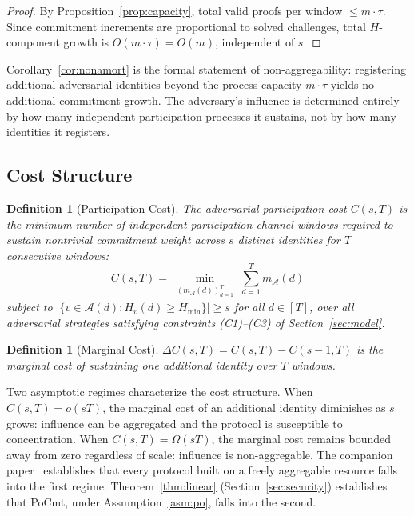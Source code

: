 \documentclass[10pt,journal,twoside]{IEEEtran}
\newtheorem{definition}[theorem]{Definition}
\theoremstyle{remark}
\begin{document}
	\begin{proof}
		By Proposition~\ref{prop:capacity}, total valid
		proofs per window $\leq m \cdot \tau$.
		Since commitment increments are proportional to
		solved challenges, total $H$-component growth is
		$O(m \cdot \tau) = O(m)$, independent of $s$.
	\end{proof}
	
	Corollary~\ref{cor:nonamort} is the formal statement of
	non-aggregability: registering additional adversarial
	identities beyond the process capacity $m \cdot \tau$
	yields no additional commitment growth.
	The adversary's influence is determined entirely by how
	many independent participation processes it sustains,
	not by how many identities it registers.
	
	\subsection{Cost Structure}
	\label{ssec:cost}
	
	\begin{definition}[Participation Cost]
		\label{def:cost}
		The \emph{adversarial participation cost} $C(s,T)$
		is the minimum number of independent participation
		channel-windows required to sustain nontrivial
		commitment weight across $s$ distinct identities for
		$T$ consecutive windows:
		\[
		C(s,T) = \min_{\substack{
				(m_{\mathcal{A}}(d))_{d=1}^{T}}}
		\sum_{d=1}^{T} m_{\mathcal{A}}(d)
		\]
		subject to
		$|\{v \in \mathcal{A}(d) : H_v(d) \geq H_{\min}\}|
		\geq s$ for all $d \in [T]$,
		over all adversarial strategies satisfying
		constraints \emph{(C1)--(C3)} of
		Section~\ref{sec:model}.
	\end{definition}
	
	\begin{definition}[Marginal Cost]
		\label{def:marginal}
		$\Delta C(s,T) = C(s,T) - C(s-1,T)$ is the marginal
		cost of sustaining one additional identity over $T$
		windows.
	\end{definition}
	
	Two asymptotic regimes characterize the cost structure.
	When $C(s,T) = o(sT)$, the marginal cost of an
	additional identity diminishes as $s$ grows: influence
	can be aggregated and the protocol is susceptible to
	concentration.
	When $C(s,T) = \Omega(sT)$, the marginal cost remains
	bounded away from zero regardless of scale: influence
	is non-aggregable.
	The companion paper~\cite{maleki2025scarcity} establishes
	that every protocol built on a freely aggregable resource
	falls into the first regime.
	Theorem~\ref{thm:linear} (Section~\ref{sec:security})
	establishes that PoCmt, under Assumption~\ref{asm:po},
	falls into the second.
\end{document}
